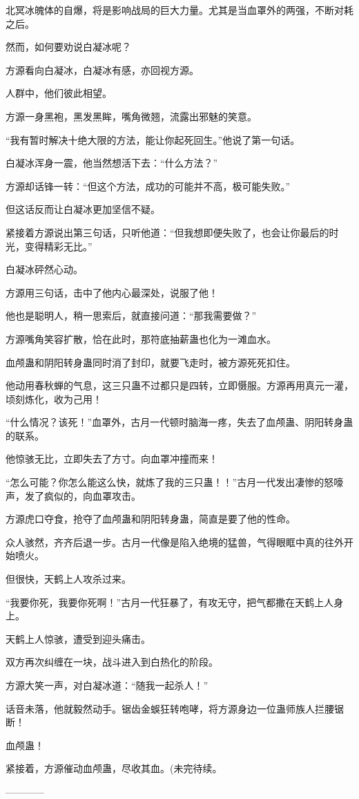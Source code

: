 \begin{this_body}
北冥冰魄体的自爆，将是影响战局的巨大力量。尤其是当血罩外的两强，不断对耗之后。

然而，如何要劝说白凝冰呢？

方源看向白凝冰，白凝冰有感，亦回视方源。

人群中，他们彼此相望。

方源一身黑袍，黑发黑眸，嘴角微翘，流露出邪魅的笑意。

“我有暂时解决十绝大限的方法，能让你起死回生。”他说了第一句话。

白凝冰浑身一震，他当然想活下去：“什么方法？”

方源却话锋一转：“但这个方法，成功的可能并不高，极可能失败。”

但这话反而让白凝冰更加坚信不疑。

紧接着方源说出第三句话，只听他道：“但我想即便失败了，也会让你最后的时光，变得精彩无比。”

白凝冰砰然心动。

方源用三句话，击中了他内心最深处，说服了他！

他也是聪明人，稍一思索后，就直接问道：“那我需要做？”

方源嘴角笑容扩散，恰在此时，那符底抽薪蛊也化为一滩血水。

血颅蛊和阴阳转身蛊同时消了封印，就要飞走时，被方源死死扣住。

他动用春秋蝉的气息，这三只蛊不过都只是四转，立即慑服。方源再用真元一灌，顷刻炼化，收为己用！

“什么情况？该死！”血罩外，古月一代顿时脑海一疼，失去了血颅蛊、阴阳转身蛊的联系。

他惊骇无比，立即失去了方寸。向血罩冲撞而来！

“怎么可能？你怎么能这么快，就炼了我的三只蛊！！”古月一代发出凄惨的怒嚎声，发了疯似的，向血罩攻击。

方源虎口夺食，抢夺了血颅蛊和阴阳转身蛊，简直是要了他的性命。

众人骇然，齐齐后退一步。古月一代像是陷入绝境的猛兽，气得眼眶中真的往外开始喷火。

但很快，天鹤上人攻杀过来。

“我要你死，我要你死啊！”古月一代狂暴了，有攻无守，把气都撒在天鹤上人身上。

天鹤上人惊骇，遭受到迎头痛击。

双方再次纠缠在一块，战斗进入到白热化的阶段。

方源大笑一声，对白凝冰道：“随我一起杀人！”

话音未落，他就毅然动手。锯齿金蜈狂转咆哮，将方源身边一位蛊师族人拦腰锯断！

血颅蛊！

紧接着，方源催动血颅蛊，尽收其血。(未完待续。

------------

\end{this_body}

